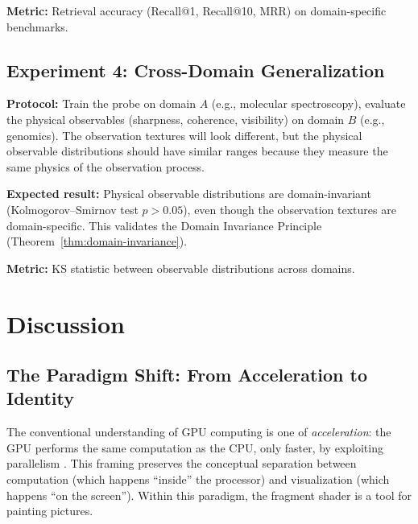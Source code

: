 \documentclass[11pt,twocolumn,a4paper]{article}
\begin{document}
\textbf{Metric:} Retrieval accuracy (Recall@1, Recall@10, MRR) on
domain-specific benchmarks.

\subsection{Experiment 4: Cross-Domain Generalization}

\textbf{Protocol:} Train the probe on domain $A$ (e.g., molecular
spectroscopy), evaluate the physical observables (sharpness,
coherence, visibility) on domain $B$ (e.g., genomics). The
observation textures will look different, but the physical
observable distributions should have similar ranges because they
measure the same physics of the observation process.

\textbf{Expected result:} Physical observable distributions are
domain-invariant (Kolmogorov--Smirnov test $p > 0.05$), even though
the observation textures are domain-specific. This validates the
Domain Invariance Principle (Theorem~\ref{thm:domain-invariance}).

\textbf{Metric:} KS statistic between observable distributions
across domains.



\section{Discussion}
\label{sec:discussion}

\subsection{The Paradigm Shift: From Acceleration to Identity}

The conventional understanding of GPU computing is one of
\emph{acceleration}: the GPU performs the same computation as the CPU,
only faster, by exploiting parallelism
\citep{owens2008,nickolls2008}. This framing preserves the conceptual
separation between computation (which happens ``inside'' the processor)
and visualization (which happens ``on the screen''). Within this
paradigm, the fragment shader is a tool for painting pictures.
\end{document}
